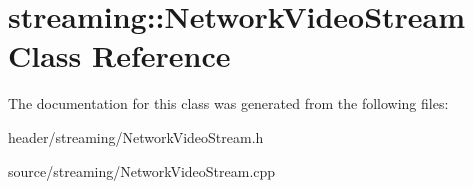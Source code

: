 \hypertarget{classstreaming_1_1_network_video_stream}{}\section{streaming\+:\+:Network\+Video\+Stream Class Reference}
\label{classstreaming_1_1_network_video_stream}


The documentation for this class was generated from the following files\+:\begin{DoxyCompactItemize}
\item 
header/streaming/Network\+Video\+Stream.\+h\item 
source/streaming/Network\+Video\+Stream.\+cpp\end{DoxyCompactItemize}
